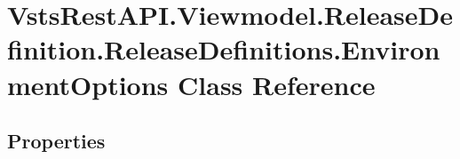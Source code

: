 \hypertarget{class_vsts_rest_a_p_i_1_1_viewmodel_1_1_release_definition_1_1_release_definitions_1_1_environment_options}{}\section{Vsts\+Rest\+A\+P\+I.\+Viewmodel.\+Release\+Definition.\+Release\+Definitions.\+Environment\+Options Class Reference}
\label{class_vsts_rest_a_p_i_1_1_viewmodel_1_1_release_definition_1_1_release_definitions_1_1_environment_options}
\subsection*{Properties}
